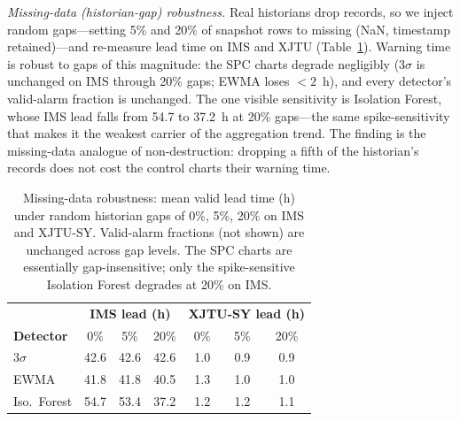 \documentclass[IJPHM, 2026, 0]{PHMSociety}
\begin{document}
\emph{Missing-data (historian-gap) robustness.} Real historians drop records, so we inject random gaps---setting 5\% and 20\% of snapshot rows to missing (NaN, timestamp retained)---and re-measure lead time on IMS and XJTU (Table~\ref{tab:missing}). Warning time is robust to gaps of this magnitude: the SPC charts degrade negligibly ($3\sigma$ is unchanged on IMS through 20\% gaps; EWMA loses $<2$~h), and every detector's valid-alarm fraction is unchanged. The one visible sensitivity is Isolation Forest, whose IMS lead falls from 54.7 to 37.2~h at 20\% gaps---the same spike-sensitivity that makes it the weakest carrier of the aggregation trend. The finding is the missing-data analogue of non-destruction: dropping a fifth of the historian's records does not cost the control charts their warning time.

\begin{table}[t] \small
	\begin{center}
	\caption{Missing-data robustness: mean valid lead time (h) under random historian gaps of 0\%, 5\%, 20\% on IMS and XJTU-SY. Valid-alarm fractions (not shown) are unchanged across gap levels. The SPC charts are essentially gap-insensitive; only the spike-sensitive Isolation Forest degrades at 20\% on IMS.}
	\label{tab:missing}
	\begin{tabular}{l c c c | c c c}
		\hline \hline
		 & \multicolumn{3}{c|}{\textbf{IMS lead (h)}} & \multicolumn{3}{c}{\textbf{XJTU-SY lead (h)}} \\
		\textbf{Detector} & 0\% & 5\% & 20\% & 0\% & 5\% & 20\% \\
		\hline
		$3\sigma$ & 42.6 & 42.6 & 42.6 & 1.0 & 0.9 & 0.9 \\
		EWMA & 41.8 & 41.8 & 40.5 & 1.3 & 1.0 & 1.0 \\
		Iso.\ Forest & 54.7 & 53.4 & 37.2 & 1.2 & 1.2 & 1.1 \\
		\hline \hline
	\end{tabular}
	\end{center}
\end{table}
\end{document}
